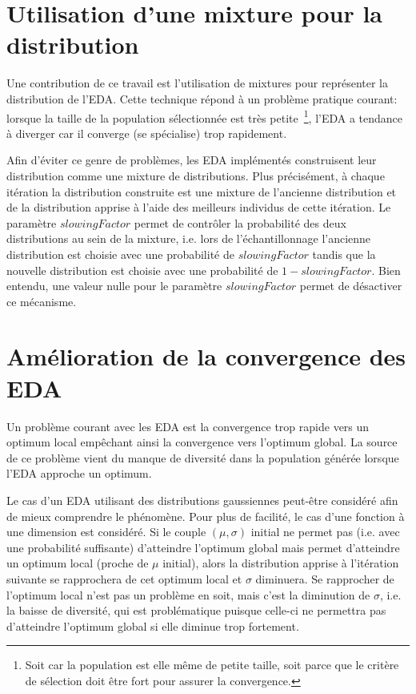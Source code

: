 \documentclass[a4paper, 11pt]{report}
\begin{document}
\section{Utilisation d'une mixture pour la distribution}
\label{mixture}
Une contribution de ce travail est l'utilisation de mixtures pour représenter la distribution de l'EDA. Cette technique répond à un problème pratique courant: lorsque la taille de la population sélectionnée est très petite~\footnote{Soit car la population est elle même de petite taille, soit parce que le critère de sélection doit être fort pour assurer la convergence.}, l'EDA a tendance à diverger car il converge (se spécialise) trop rapidement. 

Afin d'éviter ce genre de problèmes, les EDA implémentés construisent leur distribution comme une mixture de distributions. Plus précisément, à chaque itération la distribution construite est une mixture de l'ancienne distribution et de la distribution apprise à l'aide des meilleurs individus de cette itération. Le paramètre $slowingFactor$ permet de contrôler la probabilité des deux distributions au sein de la mixture, i.e. lors de l'échantillonnage l'ancienne distribution est choisie avec une probabilité de $slowingFactor$ tandis que la nouvelle distribution est choisie avec une probabilité de $1-slowingFactor$. Bien entendu, une valeur nulle pour le paramètre $slowingFactor$ permet de désactiver ce mécanisme.

\section{Amélioration de la convergence des EDA}
Un problème courant avec les EDA est la convergence trop rapide vers un optimum local empêchant ainsi la convergence vers l'optimum global. La source de ce problème vient du manque de diversité dans la population générée lorsque l'EDA approche un optimum. 

Le cas d'un EDA utilisant des distributions gaussiennes peut-être considéré afin de mieux comprendre le phénomène. Pour plus de facilité, le cas d'une fonction à une dimension est considéré. Si le couple $(\mu, \sigma)$ initial ne permet pas (i.e. avec une probabilité suffisante) d'atteindre l'optimum global mais permet d'atteindre un optimum local (proche de $\mu$ initial), alors la distribution apprise à l'itération suivante se rapprochera de cet optimum local et $\sigma$ diminuera. Se rapprocher de l'optimum local n'est pas un problème en soit, mais c'est la diminution de $\sigma$, i.e. la baisse de diversité, qui est problématique puisque celle-ci ne permettra pas d'atteindre l'optimum global si elle diminue trop fortement.
\end{document}
